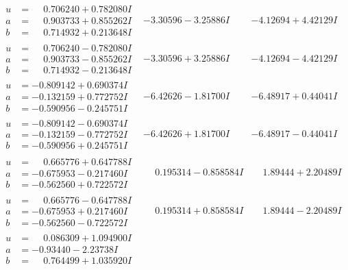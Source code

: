 \documentclass[1p]{elsarticle_modified}
\theoremstyle{definition}
\begin{document}
$$\begin{array}{c|c|c}
\begin{aligned}
u &= \phantom{-}0.706240 + 0.782080 I \\
a &= \phantom{-}0.903733 + 0.855262 I \\
b &= \phantom{-}0.714932 + 0.213648 I\end{aligned}
 & -3.30596 - 3.25886 I & -4.12694 + 4.42129 I \\ \hline\begin{aligned}
u &= \phantom{-}0.706240 - 0.782080 I \\
a &= \phantom{-}0.903733 - 0.855262 I \\
b &= \phantom{-}0.714932 - 0.213648 I\end{aligned}
 & -3.30596 + 3.25886 I & -4.12694 - 4.42129 I \\ \hline\begin{aligned}
u &= -0.809142 + 0.690374 I \\
a &= -0.132159 + 0.772752 I \\
b &= -0.590956 - 0.245751 I\end{aligned}
 & -6.42626 - 1.81700 I & -6.48917 + 0.44041 I \\ \hline\begin{aligned}
u &= -0.809142 - 0.690374 I \\
a &= -0.132159 - 0.772752 I \\
b &= -0.590956 + 0.245751 I\end{aligned}
 & -6.42626 + 1.81700 I & -6.48917 - 0.44041 I \\ \hline\begin{aligned}
u &= \phantom{-}0.665776 + 0.647788 I \\
a &= -0.675953 - 0.217460 I \\
b &= -0.562560 + 0.722572 I\end{aligned}
 & \phantom{-}0.195314 - 0.858584 I & \phantom{-}1.89444 + 2.20489 I \\ \hline\begin{aligned}
u &= \phantom{-}0.665776 - 0.647788 I \\
a &= -0.675953 + 0.217460 I \\
b &= -0.562560 - 0.722572 I\end{aligned}
 & \phantom{-}0.195314 + 0.858584 I & \phantom{-}1.89444 - 2.20489 I \\ \hline\begin{aligned}
u &= \phantom{-}0.086309 + 1.094900 I \\
a &= -0.93440 - 2.23738 I \\
b &= \phantom{-}0.764499 + 1.035920 I\end{aligned}

\end{array}$$
\end{document}
